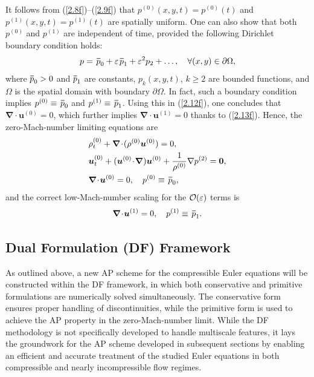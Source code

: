 \documentclass[preprint,12pt]{elsarticle}
\def\bnabla{\bm{\nabla}}
\newcommand{\ve}{\varepsilon}
\newcommand\eref[1]{(\ref{#1})}
\newcommand*\xbar[1]{%
	\hbox{%
		\vbox{%
			\hrule height 0.5pt %
			\kern0.4ex%
			\hbox{%
				\kern-0.05em%
				\ensuremath{#1}%
				\kern-0.00em%
			}%
		}%
	}%
}
\begin{document}
It follows from \eref{2.8f}--\eref{2.9f} that $p^{(0)}(x,y,t)=p^{(0)}(t)$ and $p^{(1)}(x,y,t)=p^{(1)}(t)$ are spatially uniform. One can
also show that both $p^{(0)}$ and $p^{(1)}$ are independent of time, provided the following Dirichlet boundary condition holds:
\begin{equation}
	p=\,\xbar p_0+\ve\,\xbar p_1+\ve^2 p_2+\dots,\quad\forall(x,y)\in\partial\Omega,
	\label{3.2}			
\end{equation}
where $\xbar p_0>0$ and $\xbar p_1$ are constants, $p_k(x,y,t)$, $k\ge2$ are bounded functions, and $\Omega$ is the spatial domain with
boundary $\partial\Omega$. In fact, such a boundary condition implies $p^{(0)}\equiv\,\xbar p_0$ and $p^{(1)}\equiv\,\xbar p_1$. Using this
in \eref{2.12f}, one concludes that $\bnabla\!\cdot\!\bm u^{(0)}=0$, which further implies $\bnabla\!\cdot\!\bm u^{(1)}=0$ thanks to
\eref{2.13f}. Hence, the zero-Mach-number limiting equations are
\begin{align}
	&\rho^{(0)}_t+\bnabla\!\cdot\!(\rho^{(0)}\bm u^{(0)})=0,\label{3.3}\\
	&\bm u^{(0)}_t+(\bm u^{(0)}\!\cdot\!\bnabla)\bm u^{(0)}+\frac{1}{\rho^{(0)}}\nabla p^{(2)}=\bm0,\label{3.4}\\
	&\bnabla\!\cdot\!\bm u^{(0)}=0,\quad p^{(0)}\equiv\,\xbar p_0,\label{3.5}
\end{align}
and the correct low-Mach-number scaling for the ${\cal O}(\ve)$ terms is
\begin{equation}
	\bnabla\!\cdot\!\bm u^{(1)}=0,\quad p^{(1)}\equiv\,\xbar p_1.
	\label{3.6}
\end{equation}

\subsection{Dual Formulation (DF) Framework}\label{sec4a}
As outlined above, a new AP scheme for the compressible Euler equations will be constructed within the DF framework, in which both
conservative and primitive formulations are numerically solved simultaneously. The conservative form ensures proper handling of
discontinuities, while the primitive form is used to achieve the AP property in the zero-Mach-number limit. While the DF methodology is not
specifically developed to handle multiscale features, it lays the groundwork for the AP scheme developed in subsequent sections by enabling
an efficient and accurate treatment of the studied Euler equations in both compressible and nearly incompressible flow regimes.
\end{document}

